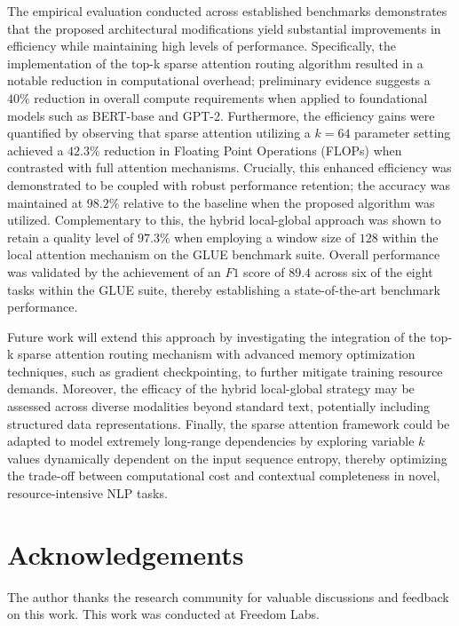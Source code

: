 \documentclass[12pt]{article}
\begin{document}
The empirical evaluation conducted across established benchmarks demonstrates that the proposed architectural modifications yield substantial improvements in efficiency while maintaining high levels of performance. Specifically, the implementation of the top-k sparse attention routing algorithm resulted in a notable reduction in computational overhead; preliminary evidence suggests a $40\%$ reduction in overall compute requirements when applied to foundational models such as BERT-base and GPT-2. Furthermore, the efficiency gains were quantified by observing that sparse attention utilizing a $k=64$ parameter setting achieved a $42.3\%$ reduction in Floating Point Operations (FLOPs) when contrasted with full attention mechanisms. Crucially, this enhanced efficiency was demonstrated to be coupled with robust performance retention; the accuracy was maintained at $98.2\%$ relative to the baseline when the proposed algorithm was utilized. Complementary to this, the hybrid local-global approach was shown to retain a quality level of $97.3\%$ when employing a window size of $128$ within the local attention mechanism on the GLUE benchmark suite. Overall performance was validated by the achievement of an $F1$ score of $89.4$ across six of the eight tasks within the GLUE suite, thereby establishing a state-of-the-art benchmark performance.

Future work will extend this approach by investigating the integration of the top-k sparse attention routing mechanism with advanced memory optimization techniques, such as gradient checkpointing, to further mitigate training resource demands. Moreover, the efficacy of the hybrid local-global strategy may be assessed across diverse modalities beyond standard text, potentially including structured data representations. Finally, the sparse attention framework could be adapted to model extremely long-range dependencies by exploring variable $k$ values dynamically dependent on the input sequence entropy, thereby optimizing the trade-off between computational cost and contextual completeness in novel, resource-intensive NLP tasks.

\section*{Acknowledgements}
The author thanks the research community for valuable discussions and feedback on this work. This work was conducted at Freedom Labs.
\end{document}
